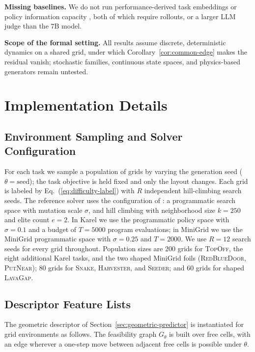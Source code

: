 \documentclass[twoside]{article}
\begin{document}
\textbf{Missing baselines.} We do not run performance-derived task embeddings \citep{mahajan2024learning} or policy information capacity \citep{furuta2021policy}, both of which require rollouts, or a larger LLM judge than the $7$B model.

\textbf{Scope of the formal setting.} All results assume discrete, deterministic dynamics on a shared grid, under which Corollary~\ref{cor:common-edge} makes the residual vanish; stochastic families, continuous state spaces, and physics-based generators remain untested.

\section{Implementation Details}
\label{app:method}

\subsection{Environment Sampling and Solver Configuration}



For each task we sample a population of grids by varying the generation seed ($\theta = \text{seed}$); the task objective is held fixed and only the layout changes. Each grid is labeled by Eq.~(\ref{eq:difficulty-label}) with $R$ independent hill-climbing search seeds. The reference solver uses the configuration of \citet{trivedi2021learning}: a programmatic search space with mutation scale $\sigma$, and hill climbing with neighborhood size $k=250$ and elite count $e=2$. In Karel we use the programmatic policy space with $\sigma=0.1$ and a budget of $T=5000$ program evaluations; in MiniGrid we use the MiniGrid programmatic space with $\sigma=0.25$ and $T=2000$. We use $R=12$ search seeds for every grid throughout. Population sizes are $200$ grids for \textsc{TopOff}, the eight additional Karel tasks, and the two shaped MiniGrid foils (\textsc{RedBlueDoor}, \textsc{PutNear}); $80$ grids for \textsc{Snake}, \textsc{Harvester}, and \textsc{Seeder}; and $60$ grids for shaped \textsc{LavaGap}.

\subsection{Descriptor Feature Lists}

The geometric descriptor of Section~\ref{sec:geometric-predictor} is instantiated for grid environments as follows. The feasibility graph $G_\theta$ is built over free cells, with an edge wherever a one-step move between adjacent free cells is possible under $\theta$.
\end{document}
